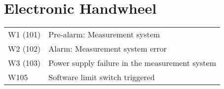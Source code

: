 \documentclass[openany,11pt]{book}
\begin{document}
\section*{Electronic Handwheel}

\begin{table}[!h]
    \begin{tabular}{ll}
    W1 (101)  & Pre-alarm: Measurement system \\
    W2 (102)  & Alarm: Measurement system error \\
    W3 (103)  & Power supply failure in the measurement system \\
    W105      & Software limit switch triggered \\
    \end{tabular}
\end{table}

\newpage
\end{document}

